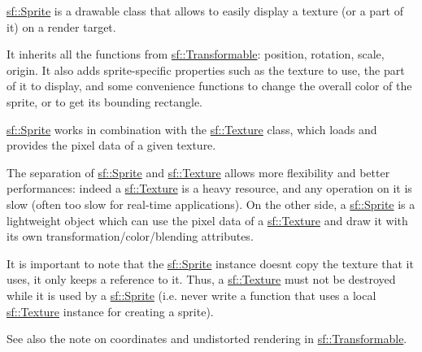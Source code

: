\begin{DoxyVerb}\end{DoxyVerb}


\mbox{\hyperlink{classsf_1_1_sprite}{sf\+::\+Sprite}} is a drawable class that allows to easily display a texture (or a part of it) on a render target.

It inherits all the functions from \mbox{\hyperlink{classsf_1_1_transformable}{sf\+::\+Transformable}}\+: position, rotation, scale, origin. It also adds sprite-\/specific properties such as the texture to use, the part of it to display, and some convenience functions to change the overall color of the sprite, or to get its bounding rectangle.

\mbox{\hyperlink{classsf_1_1_sprite}{sf\+::\+Sprite}} works in combination with the \mbox{\hyperlink{classsf_1_1_texture}{sf\+::\+Texture}} class, which loads and provides the pixel data of a given texture.

The separation of \mbox{\hyperlink{classsf_1_1_sprite}{sf\+::\+Sprite}} and \mbox{\hyperlink{classsf_1_1_texture}{sf\+::\+Texture}} allows more flexibility and better performances\+: indeed a \mbox{\hyperlink{classsf_1_1_texture}{sf\+::\+Texture}} is a heavy resource, and any operation on it is slow (often too slow for real-\/time applications). On the other side, a \mbox{\hyperlink{classsf_1_1_sprite}{sf\+::\+Sprite}} is a lightweight object which can use the pixel data of a \mbox{\hyperlink{classsf_1_1_texture}{sf\+::\+Texture}} and draw it with its own transformation/color/blending attributes.

It is important to note that the \mbox{\hyperlink{classsf_1_1_sprite}{sf\+::\+Sprite}} instance doesn\textquotesingle{}t copy the texture that it uses, it only keeps a reference to it. Thus, a \mbox{\hyperlink{classsf_1_1_texture}{sf\+::\+Texture}} must not be destroyed while it is used by a \mbox{\hyperlink{classsf_1_1_sprite}{sf\+::\+Sprite}} (i.\+e. never write a function that uses a local \mbox{\hyperlink{classsf_1_1_texture}{sf\+::\+Texture}} instance for creating a sprite).

See also the note on coordinates and undistorted rendering in \mbox{\hyperlink{classsf_1_1_transformable}{sf\+::\+Transformable}}.

